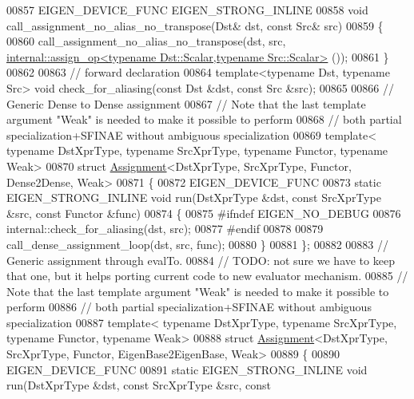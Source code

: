 \begin{DoxyCode}
00857 EIGEN\_DEVICE\_FUNC EIGEN\_STRONG\_INLINE
00858 \textcolor{keywordtype}{void} call\_assignment\_no\_alias\_no\_transpose(Dst& dst, \textcolor{keyword}{const} Src& src)
00859 \{
00860   call\_assignment\_no\_alias\_no\_transpose(dst, src, 
      \hyperlink{struct_eigen_1_1internal_1_1assign__op}{internal::assign\_op<typename Dst::Scalar,typename Src::Scalar>}
      ());
00861 \}
00862 
00863 \textcolor{comment}{// forward declaration}
00864 \textcolor{keyword}{template}<\textcolor{keyword}{typename} Dst, \textcolor{keyword}{typename} Src> \textcolor{keywordtype}{void} check\_for\_aliasing(\textcolor{keyword}{const} Dst &dst, \textcolor{keyword}{const} Src &src);
00865 
00866 \textcolor{comment}{// Generic Dense to Dense assignment}
00867 \textcolor{comment}{// Note that the last template argument "Weak" is needed to make it possible to perform}
00868 \textcolor{comment}{// both partial specialization+SFINAE without ambiguous specialization}
00869 \textcolor{keyword}{template}< \textcolor{keyword}{typename} DstXprType, \textcolor{keyword}{typename} SrcXprType, \textcolor{keyword}{typename} Functor, \textcolor{keyword}{typename} Weak>
00870 \textcolor{keyword}{struct }\hyperlink{struct_eigen_1_1internal_1_1_assignment}{Assignment}<DstXprType, SrcXprType, Functor, Dense2Dense, Weak>
00871 \{
00872   EIGEN\_DEVICE\_FUNC
00873   \textcolor{keyword}{static} EIGEN\_STRONG\_INLINE \textcolor{keywordtype}{void} run(DstXprType &dst, \textcolor{keyword}{const} SrcXprType &src, \textcolor{keyword}{const} Functor &func)
00874   \{
00875 \textcolor{preprocessor}{#ifndef EIGEN\_NO\_DEBUG}
00876     internal::check\_for\_aliasing(dst, src);
00877 \textcolor{preprocessor}{#endif}
00878     
00879     call\_dense\_assignment\_loop(dst, src, func);
00880   \}
00881 \};
00882 
00883 \textcolor{comment}{// Generic assignment through evalTo.}
00884 \textcolor{comment}{// TODO: not sure we have to keep that one, but it helps porting current code to new evaluator mechanism.}
00885 \textcolor{comment}{// Note that the last template argument "Weak" is needed to make it possible to perform}
00886 \textcolor{comment}{// both partial specialization+SFINAE without ambiguous specialization}
00887 \textcolor{keyword}{template}< \textcolor{keyword}{typename} DstXprType, \textcolor{keyword}{typename} SrcXprType, \textcolor{keyword}{typename} Functor, \textcolor{keyword}{typename} Weak>
00888 \textcolor{keyword}{struct }\hyperlink{struct_eigen_1_1internal_1_1_assignment}{Assignment}<DstXprType, SrcXprType, Functor, EigenBase2EigenBase, Weak>
00889 \{
00890   EIGEN\_DEVICE\_FUNC
00891   \textcolor{keyword}{static} EIGEN\_STRONG\_INLINE \textcolor{keywordtype}{void} run(DstXprType &dst, \textcolor{keyword}{const} SrcXprType &src, \textcolor{keyword}{const} 

\end{DoxyCode}
